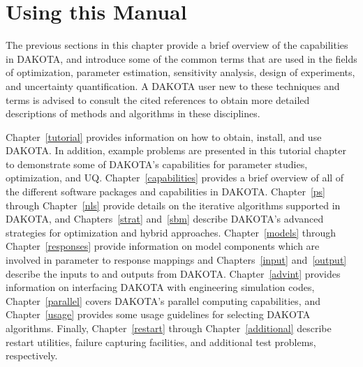 

\section{Using this Manual}\label{introduction:using}

The previous sections in this chapter provide a brief overview of the
capabilities in DAKOTA, and introduce some of the common terms that
are used in the fields of optimization, parameter estimation,
sensitivity analysis, design of experiments, and uncertainty
quantification. A DAKOTA user new to these techniques and terms is
advised to consult the cited references to obtain more detailed
descriptions of methods and algorithms in these disciplines.

Chapter~\ref{tutorial} provides information on how to obtain, install,
and use DAKOTA. In addition, example problems are presented in this
tutorial chapter to demonstrate some of DAKOTA's capabilities for
parameter studies, optimization, and UQ. Chapter~\ref{capabilities}
provides a brief overview of all of the different software packages
and capabilities in DAKOTA. Chapter~\ref{ps} through Chapter~\ref{nls}
provide details on the iterative algorithms supported in DAKOTA, and
Chapters~\ref{strat} and~\ref{sbm} describe DAKOTA's advanced
strategies for optimization and hybrid approaches.
Chapter~\ref{models} through Chapter~\ref{responses} provide
information on model components which are involved in parameter to
response mappings and Chapters~\ref{input} and~\ref{output} describe
the inputs to and outputs from DAKOTA.  Chapter~\ref{advint} provides
information on interfacing DAKOTA with engineering simulation codes,
Chapter~\ref{parallel} covers DAKOTA's parallel computing
capabilities, and Chapter~\ref{usage} provides some usage guidelines
for selecting DAKOTA algorithms.  Finally, Chapter~\ref{restart}
through Chapter~\ref{additional} describe restart utilities, failure
capturing facilities, and additional test problems, respectively.
